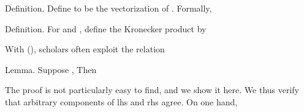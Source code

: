 %


\Result
{Definition.}
{
Define  to be the vectorization of .
Formally,
}

\Result
{Definition.}
{
For  and , define the Kronecker product  by
}

With (), scholars often exploit the relation

\Result
{Lemma.}
{
Suppose ,
Then
}

The proof is not particularly easy to find, and we show it here.
We thus verify that arbitrary components of lhs and rhs agree.
On one hand,


